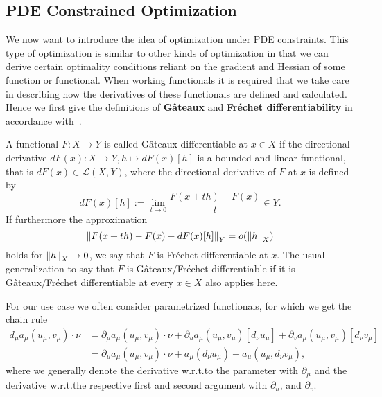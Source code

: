 \subsection{PDE Constrained Optimization}

We now want to introduce the idea of optimization under PDE constraints.
This type of optimization is similar to other kinds of optimization in that we can derive certain optimality conditions reliant on the gradient and Hessian of some function or functional.
When working functionals it is required that we take care in describing how the derivatives of these functionals are defined and calculated.
Hence we first give the definitions of \textbf{G\^{a}teaux} and \textbf{Fr\'{e}chet differentiability} in accordance with~\cite[Section 1.4]{Hinze2009}.

A functional $F: X \rightarrow Y$ is called G\^{a}teaux differentiable at $x \in X$ if the directional derivative $dF(x): X \rightarrow Y, h \mapsto dF (x) [ h ]$ is a bounded and linear functional, that is $dF(x) \in \mathcal{L}(X, Y)$, where the directional derivative of $F$ at $x$ is defined by
\begin{equation*}\label{DirDeriv}
    dF(x)[h] := \lim\limits_{t \rightarrow 0} \frac{F(x + th) - F(x)}{t} \in Y.
\end{equation*}
If furthermore the approximation
\begin{equation*}\label{FrechDeriv}
    \norm[Y]{F(x + th) - F(x) - dF(x)[h]} = o(\norm[X]{h})
\end{equation*}
holds for $\norm[X]{h} \rightarrow 0$, we say that $F$ is Fr\'{e}chet differentiable at $x$.
The usual generalization to say that $F$ is G\^{a}teaux/Fr\'{e}chet differentiable if it is G\^{a}teaux/Fr\'{e}chet differentiable at every $x \in X$ also applies here.

For our use case we often consider parametrized functionals, for which we get the chain rule
\begin{align*}
    d_\mu a_\mu(u_\mu, v_\mu) \cdot \nu &= \partial_\mu a_\mu(u_\mu, v_\mu) \cdot \nu + \partial_u a_\mu(u_\mu, v_\mu)[d_\nu u_\mu] + \partial_v a_\mu(u_\mu, v_\mu)[d_\nu v_\mu] \\
    &= \partial_\mu a_\mu(u_\mu, v_\mu) \cdot \nu + a_\mu(d_\nu u_\mu) + a_\mu(u_\mu, d_\nu v_\mu),
\end{align*}
where we generally denote the derivative w.r.t.\@ to the parameter with $\partial_\mu$ and the derivative w.r.t.\@ the respective first and second argument with $\partial_u$, and $\partial_v$.

